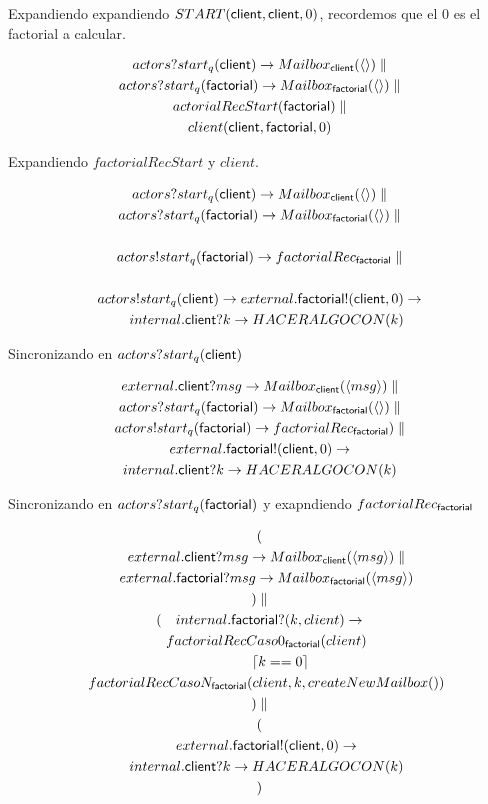 \documentclass[fleqn]{article}
\newcommand{\myList}[1]{\langle #1 \rangle}
\begin{document}
Expandiendo expandiendo $START(\mathsf{client},\mathsf{client}, 0)$, recordemos que el 0 es el
factorial a calcular.

\begin{gather*}
actors?start_q(\mbc) \rightarrow Mailbox_\mbc(\myList{}) \parallel \\
actors?start_q(\mbf) \rightarrow Mailbox_\mbf(\myList{}) \parallel \\
actorialRecStart(\mbf) \parallel \\
client(\mbc, \mbf, 0)
\end{gather*}

Expandiendo $factorialRecStart$ y $client$.

\begin{gather*}
actors?start_q(\mbc) \rightarrow Mailbox_\mbc(\myList{}) \parallel \\
actors?start_q(\mbf) \rightarrow Mailbox_\mbf(\myList{}) \parallel \\ \\
actors!start_q(\mbf) \rightarrow factorialRec_\mbf \parallel \\ \\
actors!start_q(\mbc) \rightarrow external.\mbf!(\mbc,0) \rightarrow \\ 
\quad internal.\mbc?k \rightarrow HACERALGOCON(k)
\end{gather*}

Sincronizando en $actors?start_q(\mathsf{client})$ 

\begin{gather*}
external.\mbc?msg \rightarrow Mailbox_\mbc(\myList{msg})  \parallel \\
actors?start_q(\mbf) \rightarrow Mailbox_\mbf(\myList{}) \parallel \\
actors!start_q(\mbf) \rightarrow factorialRec_\mbf ) \parallel \\
external.\mbf!(\mbc,0) \rightarrow \\
internal.\mbc?k \rightarrow HACERALGOCON(k) 
\end{gather*}

Sincronizando en $actors?start_q(\mathsf{factorial})$ y exapndiendo $factorialRec_{\mathsf{factorial}}$

\begin{gather*}
( \\ 
\quad external.\mbc?msg \rightarrow Mailbox_\mbc(\myList{msg})  \parallel \\
\quad external.\mbf?msg \rightarrow Mailbox_\mbf(\myList{msg})  \\
) \parallel \\
(
\quad internal.\mbf?(k,client) \rightarrow \\
\quad factorialRecCaso0_\mbf(client) \\
\quad \qquad \lceil k == 0 \rceil \\
\quad factorialRecCasoN_\mbf(client, k, createNewMailbox()) \\
) \parallel \\
( \\
\quad external.\mbf!(\mbc,0) \rightarrow \\
\quad internal.\mbc?k \rightarrow HACERALGOCON(k) \\ 
)
\end{gather*}
\end{document}
